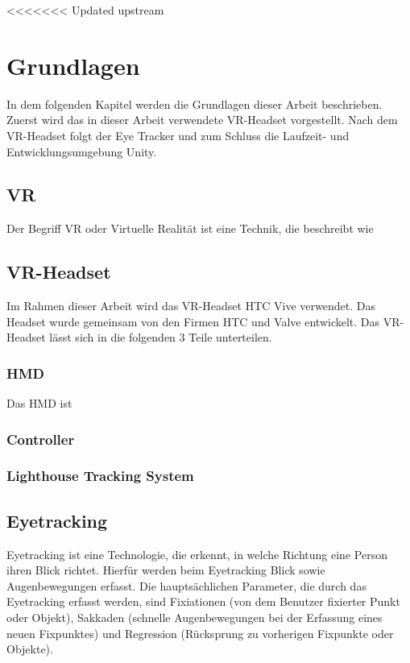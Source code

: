 <<<<<<< Updated upstream

\chapter{Grundlagen}
In dem folgenden Kapitel werden die Grundlagen dieser Arbeit beschrieben. Zuerst wird das in dieser Arbeit verwendete \acs{VR}-Headset vorgestellt. Nach dem \acs{VR}-Headset folgt der Eye Tracker und zum Schluss die Laufzeit- und Entwicklungsumgebung Unity.

\section{\acl{VR}}
Der Begriff \ac{VR} oder Virtuelle Realität ist eine Technik, die beschreibt wie 

\section{\acs{VR}-Headset}
Im Rahmen dieser Arbeit wird das \acs{VR}-Headset HTC Vive verwendet. Das Headset wurde gemeinsam von den Firmen HTC und Valve entwickelt. Das \acs{VR}-Headset lässt sich in die folgenden 3 Teile unterteilen. 

\cite{Clay_Koenig_Koenig_2019}
\subsection{\acl{HMD}}
Das \ac{HMD} ist 

\subsection{Controller}

\subsection{Lighthouse Tracking System}

\section{Eyetracking}
Eyetracking ist eine Technologie, die erkennt, in welche Richtung eine Person ihren Blick richtet. Hierfür werden beim Eyetracking Blick sowie Augenbewegungen erfasst. Die hauptsächlichen Parameter, die durch das Eyetracking erfasst werden, sind Fixiationen (von dem Benutzer fixierter Punkt oder Objekt), Sakkaden (schnelle Augenbewegungen bei der Erfassung eines neuen Fixpunktes) und Regression (Rücksprung zu vorherigen Fixpunkte oder Objekte).

